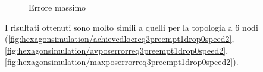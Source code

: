 \begin{figure}[H]
    \centering
    \hfill
    \caption{Errore massimo}
\end{figure}
I risultati ottenuti sono molto simili a quelli per la topologia a 6 nodi (\ref{fig:hexagonsimulation/achievedlocreq3preempt1drop0speed2}, \ref{fig:hexagonsimulation/avposerrorreq3preempt1drop0speed2}, \ref{fig:hexagonsimulation/maxposerrorreq3preempt1drop0speed2}).


